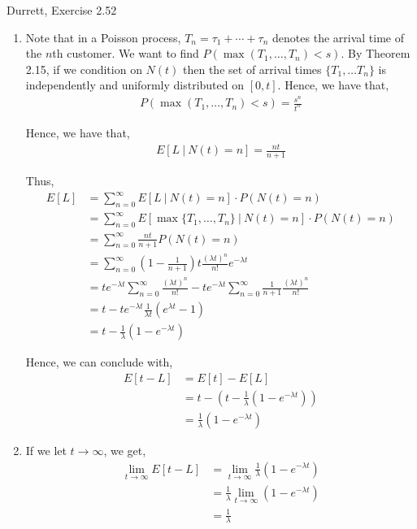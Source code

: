 \documentclass[12pt]{article}
\newenvironment{problem}[2][Problem]{\begin{trivlist}
\item[\hskip \labelsep {\bfseries #1}\hskip \labelsep {\bfseries #2.}]}{\end{trivlist}}
\begin{document}
\begin{problem}{3}
Durrett, Exercise 2.52
\end{problem}

\begin{enumerate}[label=(\alph*)]

\item Note that in a Poisson process, $T_n = \tau_1 + \cdots + \tau_n$ denotes the arrival time of the $n$th customer. We want to find $P(\max(T_1, \ldots, T_n) < s)$. By Theorem 2.15, if we condition on $N(t)$ then the set of arrival times $\{T_1, \ldots T_n\}$ is independently and uniformly distributed on $[0, t]$. Hence, we have that,
\begin{align*}
P(\max(T_1, \ldots, T_n) < s) = \frac{s^n}{t^n}
\end{align*}

Hence, we have that,
\begin{align*}
E[L \ | \ N(t) = n] = \frac{nt}{n+1}
\end{align*}

Thus,
\begin{align*}
E[L] &= \sum_{n=0}^{\infty} E[L \ | \ N(t) = n] \cdot P(N(t) = n)\\
&= \sum_{n=0}^{\infty} E[\max\{T_1, \ldots, T_n\} \ | \ N(t) = n] \cdot P(N(t) = n)\\
&= \sum_{n=0}^{\infty} \frac{nt}{n+1} P(N(t) = n)\\
&= \sum_{n=0}^{\infty} \left(1 - \frac{1}{n+1} \right)t \frac{(\lambda t)^n}{n!} e^{-\lambda t}\\
&= te^{-\lambda t} \sum_{n=0}^{\infty} \frac{(\lambda t)^n}{n!} - te^{-\lambda t} \sum_{n=0}^{\infty} \frac{1}{n+1} \frac{(\lambda t)^n}{n!}\\
&= t - te^{-\lambda t}\frac{1}{\lambda t} (e^{\lambda t} - 1)\\
&= t - \frac{1}{\lambda}(1 - e^{-\lambda t})
\end{align*}

Hence, we can conclude with,
\begin{align*}
E[t - L] &= E[t] - E[L]\\
&= t - (t - \frac{1}{\lambda}(1 - e^{-\lambda t}))\\
&= \frac{1}{\lambda}(1 - e^{-\lambda t})
\end{align*}

\item If we let $t \to \infty$, we get,
\begin{align*}
\lim_{t \to \infty} E[t - L] &= \lim_{t \to \infty} \frac{1}{\lambda}(1 - e^{-\lambda t})\\
&= \frac{1}{\lambda} \lim_{t \to \infty} (1 - e^{-\lambda t})\\
&= \frac{1}{\lambda}
\end{align*}

\end{enumerate}
\end{document}
